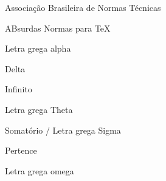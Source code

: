 \documentclass[
	12pt,				%
	oneside, %
	a4paper,			%
	english,			%
	brazil				%
	]{abntex2}
\begin{document}
%
%
%
\listoffigures*
\cleardoublepage

\listoftables*
\cleardoublepage

\begin{siglas}
  \item[ABNT] Associação Brasileira de Normas Técnicas
  \item[abnTeX] ABsurdas Normas para TeX
\end{siglas}

\begin{simbolos}
  \item[$ \alpha $] Letra grega alpha
  \item[$ \Delta $] Delta
  \item[$ \infty $] Infinito
  \item[$ \Theta $] Letra grega Theta  
  \item[$ \Sigma $] Somatório / Letra grega Sigma  
  \item[$ \in $] Pertence
  \item[$ \Omega $] Letra grega omega
\end{simbolos}

\tableofcontents*
\cleardoublepage
\makeatletter
{}
\makeatother



\textual
\end{document}
